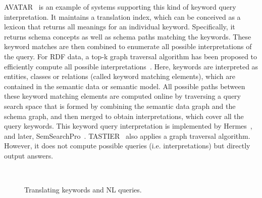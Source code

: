 AVATAR~\cite{DBLP:conf/sigmod/KandoganKRVZ06} is an example of systems supporting this kind of keyword query interpretation. It maintains a translation index, which can be conceived as a lexicon that returns all meanings for an individual keyword. Specifically, it returns schema concepts as well as schema paths matching the keywords. These keyword matches are then combined to enumerate all possible interpretations of the query. For RDF data, a top-k graph traversal algorithm has been proposed to efficiently compute all possible interpretations~\cite{DBLP:conf/icde/TranWRC09}. Here, keywords are interpreted as entities, classes or relations (called keyword matching elements), which are contained in the semantic data or semantic model. All possible paths between these keyword matching elements are computed online by traversing a query search space that is formed by combining the semantic data graph and the schema graph, and then merged to obtain interpretations, which cover all the query keywords. This keyword query interpretation is implemented by Hermes~\cite{DBLP:journals/ws/TranWH09}, and later, SemSearchPro~\cite{DBLP:journals/ws/TranHL11}. TASTIER~\cite{DBLP:conf/sigmod/LiJLF09} also applies a graph traversal algorithm. However, it does not compute possible queries (i.e. interpretations) but directly output answers. 

\begin{figure}[htb]
	\centering
  ~ %
 \caption{Translating keywords and NL queries.}
 \label{fig:translation}
 \vspace{-0.5cm}
\end{figure}


